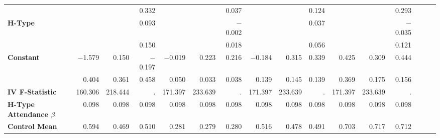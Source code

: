 \begin{tabular}{@{\extracolsep{5pt}}lrrrrrrrrrrrrrrr}
{\bf } & \phantom{***} & \phantom{***} & 0.332\phantom{\phantom{)}***} & \phantom{***} & \phantom{***} & 0.037\phantom{\phantom{)}***} & \phantom{***} & \phantom{***} & 0.124\phantom{\phantom{)}***} & \phantom{***} & \phantom{***} & 0.293\phantom{\phantom{)}***} \\
{\bf H-Type} & \phantom{***} & \phantom{***} & 0.093\phantom{\phantom{)}***} & \phantom{***} & \phantom{***} & $-$0.002\phantom{\phantom{)}***} & \phantom{***} & \phantom{***} & 0.037\phantom{\phantom{)}***} & \phantom{***} & \phantom{***} & $-$0.035\phantom{\phantom{)}***} \\
{\bf } & \phantom{***} & \phantom{***} & 0.150\phantom{\phantom{)}***} & \phantom{***} & \phantom{***} & 0.018\phantom{\phantom{)}***} & \phantom{***} & \phantom{***} & 0.056\phantom{\phantom{)}***} & \phantom{***} & \phantom{***} & 0.121\phantom{\phantom{)}***} \\
{\bf Constant} & $-$1.579\phantom{\phantom{)}***} & 0.150\phantom{\phantom{)}***} & $-$0.197\phantom{\phantom{)}***} & $-$0.019\phantom{\phantom{)}***} & 0.223\phantom{\phantom{)}***} & 0.216\phantom{\phantom{)}***} & $-$0.184\phantom{\phantom{)}***} & 0.315\phantom{\phantom{)}***} & 0.339\phantom{\phantom{)}***} & 0.425\phantom{\phantom{)}***} & 0.309\phantom{\phantom{)}***} & 0.444\phantom{\phantom{)}***} \\
{\bf } & 0.404\phantom{\phantom{)}***} & 0.361\phantom{\phantom{)}***} & 0.458\phantom{\phantom{)}***} & 0.050\phantom{\phantom{)}***} & 0.033\phantom{\phantom{)}***} & 0.038\phantom{\phantom{)}***} & 0.139\phantom{\phantom{)}***} & 0.145\phantom{\phantom{)}***} & 0.139\phantom{\phantom{)}***} & 0.369\phantom{\phantom{)}***} & 0.175\phantom{\phantom{)}***} & 0.156\phantom{\phantom{)}***} \\
{\bf IV F-Statistic} & 160.306\phantom{\phantom{)}***} & 218.444\phantom{\phantom{)}***} & .\phantom{\phantom{)}***} & 171.397\phantom{\phantom{)}***} & 233.639\phantom{\phantom{)}***} & .\phantom{\phantom{)}***} & 171.397\phantom{\phantom{)}***} & 233.639\phantom{\phantom{)}***} & .\phantom{\phantom{)}***} & 171.397\phantom{\phantom{)}***} & 233.639\phantom{\phantom{)}***} & .\phantom{\phantom{)}***} \\
{\bf H-Type Attendance $\beta$} & 0.098\phantom{***} & 0.098\phantom{***} & 0.098\phantom{***} & 0.098\phantom{***} & 0.098\phantom{***} & 0.098\phantom{***} & 0.098\phantom{***} & 0.098\phantom{***} & 0.098\phantom{***} & 0.098\phantom{***} & 0.098\phantom{***} & 0.098\phantom{***} \\
{\bf Control Mean} & 0.594\phantom{***} & 0.469\phantom{***} & 0.510\phantom{***} & 0.281\phantom{***} & 0.279\phantom{***} & 0.280\phantom{***} & 0.516\phantom{***} & 0.478\phantom{***} & 0.491\phantom{***} & 0.703\phantom{***} & 0.717\phantom{***} & 0.712\phantom{***} \\

\end{tabular}
